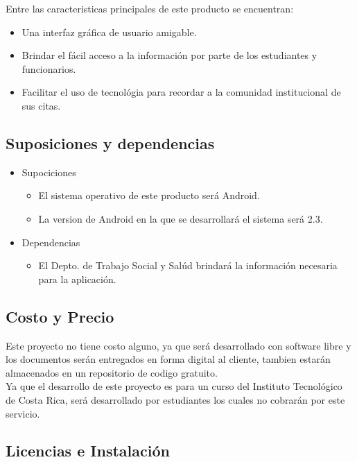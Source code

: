 \documentclass[12pt]{article}
\begin{document}
Entre las caracteristicas principales de este producto se encuentran:
\begin{itemize}
	\item{Una interfaz gr\'afica de usuario amigable.}
	\item{Brindar el f\'acil acceso a la informaci\'on por parte de los estudiantes y funcionarios.}
	\item{Facilitar el uso de tecnol\'ogia para recordar a la comunidad institucional de sus citas.}
\end{itemize}


\subsection{Suposiciones y dependencias}

\begin{itemize}

\item{Supociciones}
\begin{itemize}
	\item{El sistema operativo de este producto ser\'a Android.}
	\item{La version de Android en la que se desarrollar\'a el sistema ser\'a 2.3.}
\end{itemize}

\item{Dependencias}
\begin{itemize}
	\item{El Depto. de Trabajo Social y Sal\'ud brindar\'a la informaci\'on necesaria para la aplicaci\'on.}
\end{itemize}

\end{itemize}

\subsection{Costo y Precio}

Este proyecto no tiene costo alguno, ya que ser\'a desarrollado con software libre y los documentos ser\'an entregados en forma digital al cliente, tambien estar\'an almacenados en un repositorio de codigo gratuito. \\[0.2in]
Ya que el desarrollo de este proyecto es para un curso del Instituto Tecnol\'ogico de Costa Rica, ser\'a desarrollado por estudiantes los cuales no cobrar\'an por este servicio.

\subsection{Licencias e Instalaci\'on}
\end{document}
